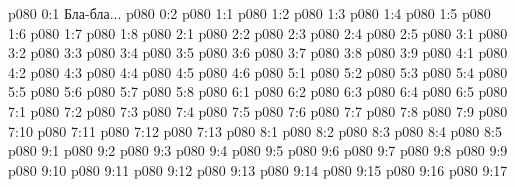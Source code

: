 \author{Архангел}
\vs p080 0:1  Бла-бла...
\vs p080 0:2 
\vs p080 1:1 
\vs p080 1:2 
\vs p080 1:3 
\vs p080 1:4 
\vs p080 1:5 
\vs p080 1:6 
\vs p080 1:7 
\vs p080 1:8 
\vs p080 2:1 
\vs p080 2:2 
\vs p080 2:3 
\vs p080 2:4 \pc 
\vs p080 2:5 
\vs p080 3:1 
\vs p080 3:2 
\vs p080 3:3 
\vs p080 3:4 
\vs p080 3:5 
\vs p080 3:6 
\vs p080 3:7 
\vs p080 3:8 \pc 
\vs p080 3:9 
\vs p080 4:1 
\vs p080 4:2 
\vs p080 4:3 
\vs p080 4:4 \pc 
\vs p080 4:5 
\vs p080 4:6 \pc 
{}
\vs p080 5:1 
\vs p080 5:2 
\vs p080 5:3 \pc 
\vs p080 5:4 
\vs p080 5:5 \pc 
\vs p080 5:6 
\vs p080 5:7 \pc 
\vs p080 5:8 \pc 
{}
\vs p080 6:1 
\vs p080 6:2 
\vs p080 6:3 \pc 
\vs p080 6:4 \pc 
\vs p080 6:5 
\vs p080 7:1 
\vs p080 7:2 
\vs p080 7:3 
\vs p080 7:4 
\vs p080 7:5 \pc 
\vs p080 7:6 
\vs p080 7:7 
\vs p080 7:8 \pc 
\vs p080 7:9 \pc 
\vs p080 7:10 
\vs p080 7:11 \pc 
\vs p080 7:12 \pc 
\vs p080 7:13 \pc 
{}
\vs p080 8:1 
\vs p080 8:2 
\vs p080 8:3 
\vs p080 8:4 
\vs p080 8:5 
\vs p080 9:1 
\vs p080 9:2 
\vs p080 9:3 
\vs p080 9:4 
\vs p080 9:5 
\vs p080 9:6 
\vs p080 9:7 
\vs p080 9:8 
\vs p080 9:9 
\vs p080 9:10 
\vs p080 9:11 
\vs p080 9:12 \pc 
\vs p080 9:13 \pc 
\vs p080 9:14 
\vs p080 9:15 \pc 
\vs p080 9:16 
\vsetoff
\vs p080 9:17 
\quizlink
